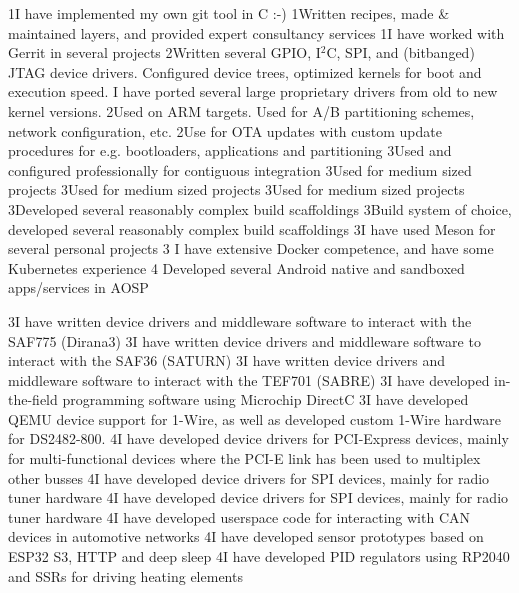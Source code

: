 \documentclass{twocolcv}
\begin{document}
 {
                {1}{I have implemented my own git tool in C :-)}
              {1}{Written recipes, made \& maintained layers, and provided expert consultancy services}
             {1}{I have worked with Gerrit in several projects}
       {2}{Written several GPIO, I$^2$C, SPI, and (bitbanged) JTAG device drivers. Configured device trees, optimized kernels for boot and execution speed. I have ported several large proprietary drivers from old to new kernel versions.}
             {2}{Used on ARM targets. Used for A/B partitioning schemes, network configuration, etc.}
           {2}{Use for OTA updates with custom update procedures for e.g. bootloaders, applications and partitioning}
            {3}{Used and configured professionally for contiguous integration}
            {3}{Used for medium sized projects}
               {3}{Used for medium sized projects}
             {3}{Used for medium sized projects}
           {3}{Developed several reasonably complex build scaffoldings}
              {3}{Build system of choice, developed several reasonably complex build scaffoldings}
              {3}{I have used Meson for several personal projects}
        {3} {I have extensive Docker competence, and have some Kubernetes experience}
       {4} {Developed several Android native and sandboxed apps/services in AOSP}
}

 {
      {3}{I have written device drivers and middleware software to interact with the SAF775 (Dirana3)}
       {3}{I have written device drivers and middleware software to interact with the SAF36 (SATURN)}
      {3}{I have written device drivers and middleware software to interact with the TEF701 (SABRE)}
      {3}{I have developed in-the-field programming software using Microchip DirectC}
     {3}{I have developed QEMU device support for 1-Wire, as well as developed custom 1-Wire hardware for DS2482-800.}
     {4}{I have developed device drivers for PCI-Express devices, mainly for multi-functional devices where the PCI-E link has been used to multiplex other busses}
             {4}{I have developed device drivers for SPI devices, mainly for radio tuner hardware}
          {4}{I have developed device drivers for SPI devices, mainly for radio tuner hardware}
             {4}{I have developed userspace code for interacting with CAN devices in automotive networks}
        {4}{I have developed sensor prototypes based on ESP32 S3, HTTP and deep sleep}
          {4}{I have developed PID regulators using RP2040 and SSRs for driving heating elements}
}
\end{document}
